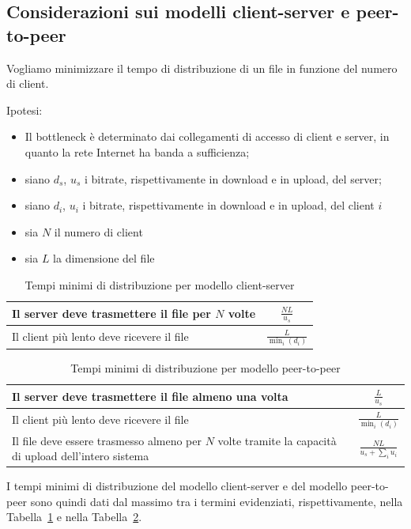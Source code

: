 \documentclass[12pt,a4paper]{article}
\begin{document}
\subsection{Considerazioni sui modelli client-server e peer-to-peer}
Vogliamo minimizzare il tempo di distribuzione di un file in funzione
del numero di client.

Ipotesi:
\begin{itemize}
  \item Il bottleneck è determinato dai collegamenti di accesso di
    client e server, in quanto la rete Internet ha banda a sufficienza;
  \item siano $d_s$, $u_s$ i bitrate, rispettivamente in download e
    in upload, del server;
  \item siano $d_i$, $u_i$ i bitrate, rispettivamente in download e
    in upload, del client $i$
  \item sia $N$ il numero di client
  \item sia $L$ la dimensione del file
\end{itemize}

\begin{table}[H]
\centering
\begin{tabular}{| p{10cm} | c |}\hline
  Il server deve trasmettere il file per $N$ volte  & $\frac{N L}{u_s} $ \\ \hline
  Il client più lento deve ricevere il file         & $\frac{L}{\min_{i}(d_i)} $ \\ \hline
\end{tabular}
\caption{Tempi minimi di distribuzione per modello client-server}
\label{tab:tempi-cs}
\end{table}

\begin{table}[H]
\centering
\begin{tabular}{| p{10cm} | c |}\hline
  Il server deve trasmettere il file almeno una volta & $\frac{L}{u_s}$ \\ \hline
  Il client più lento deve ricevere il file           & $\frac{L}{\min_{i}(d_i)}$ \\ \hline
  Il file deve essere trasmesso almeno per $N$ volte
  tramite la capacità di upload dell'intero sistema   & $\frac{N L}{u_s + \sum_{i} u_i}$ \\ \hline
\end{tabular}
\caption{Tempi minimi di distribuzione per modello peer-to-peer}
\label{tab:tempi-p2p}
\end{table}

I tempi minimi di distribuzione del modello client-server e del modello
peer-to-peer sono quindi dati dal massimo tra i termini evidenziati,
rispettivamente, nella Tabella~\ref{tab:tempi-cs} e nella
Tabella~\ref{tab:tempi-p2p}.
\end{document}
